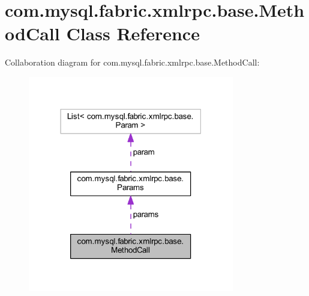 \hypertarget{classcom_1_1mysql_1_1fabric_1_1xmlrpc_1_1base_1_1_method_call}{}\section{com.\+mysql.\+fabric.\+xmlrpc.\+base.\+Method\+Call Class Reference}
\label{classcom_1_1mysql_1_1fabric_1_1xmlrpc_1_1base_1_1_method_call}


Collaboration diagram for com.\+mysql.\+fabric.\+xmlrpc.\+base.\+Method\+Call\+:\nopagebreak
\begin{figure}[H]
\begin{center}
\leavevmode
\includegraphics[width=255pt]{classcom_1_1mysql_1_1fabric_1_1xmlrpc_1_1base_1_1_method_call__coll__graph}
\end{center}
\end{figure}
